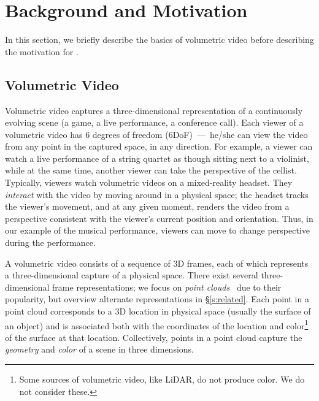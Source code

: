 \section{Background and Motivation}
\label{s:background}

In this section, we briefly describe the basics of volumetric video before describing the motivation for \sysname.

\subsection{Volumetric Video}

Volumetric video captures a three-dimensional representation of a continuously evolving scene (\eg a game, a live performance, a conference call).
%
Each viewer of a volumetric video has 6 degrees of freedom (6DoF)~---~he/she can view the video from any point in the captured space, in any direction.
%
For example, a viewer can watch a live performance of a string quartet as though sitting next to a violinist, while at the same time, another viewer can take the perspective of the cellist.
%
Typically, viewers watch volumetric videos on a mixed-reality headset.
%
They \emph{interact} with the video by moving around in a physical space; the
headset tracks the viewer's movement, and at any given moment, renders the
video from a perspective consistent with the viewer's current position and
orientation.
%
Thus, in our example of the musical performance, viewers can move to change perspective during the performance.

A volumetric video consists of a sequence of 3D frames, each of which represents a three-dimensional capture of a physical space.
%
There exist several three-dimensional frame representations; we focus on \emph{point clouds}~\cite{cite:vivo, cite:groot} due to their popularity, but overview alternate representations in \S\ref{s:related}.
%
Each point in a point cloud corresponds to a 3D location in physical space (usually the surface of an object) and is associated both with the coordinates of the location and color\footnote{Some sources of volumetric video, like LiDAR, do not produce color. We do not consider these.}
of the surface at that location.
%
Collectively, points in a point cloud capture the \emph{geometry} and \emph{color} of a scene in three dimensions. %


